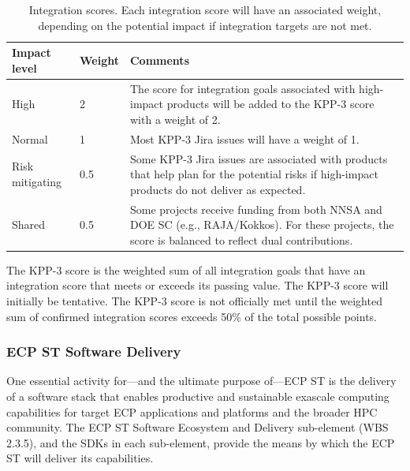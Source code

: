 \begin{table}[h!]
	\begin{tabular}{|L{1.0in}|L{0.5in}|L{4.5in}|}\hline
		\textbf{Impact level} & \textbf{Weight} & \textbf{Comments}\\\hline
		High & 2 & The score for integration goals associated with high-impact products will be added to the KPP-3 score with a weight of 2.\\\hline
		Normal & 1 & Most KPP-3 Jira issues will have a weight of 1.\\\hline
		Risk mitigating & 0.5 & Some KPP-3 Jira issues are associated with products that help plan for the potential risks if high-impact products do not deliver as expected.\\\hline
		Shared  & 0.5 & Some projects receive funding from both NNSA and DOE SC (e.g., RAJA/Kokkos). For these projects, the score is balanced to reflect dual contributions.\\\hline
	\end{tabular}
	\caption{\label{table:KPP-3-impact} Integration scores. Each integration score will have an associated weight, depending on the potential impact if integration targets are not met.}
\end{table}

The KPP-3 score is the weighted sum of all integration goals that have an integration score that meets or exceeds its passing value. 
The KPP-3 score will initially be tentative.  The KPP-3 score is not officially met until the weighted sum of confirmed integration scores exceeds 50\% of the total possible points.


\subsubsection{ECP ST Software Delivery}
One essential activity for---and the ultimate purpose of---ECP ST is the delivery of a software stack that enables productive and sustainable exascale computing capabilities for target ECP applications and platforms and the broader HPC community. The ECP ST Software Ecosystem and Delivery sub-element (WBS 2.3.5), and the SDKs in each sub-element, provide the means by which the ECP ST will deliver its capabilities.

